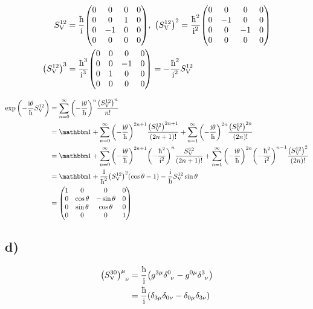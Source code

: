 \documentclass[twoside]{amsart}
\numberwithin{equation}{section}
\begin{document}
\begin{align*}
    S^{12}_\textnormal{V}&=\frac\hbar\im\mqty(0&0&0&0\\0&0&1&0\\0&-1&0&0\\0&0&0&0),\ \qty(S^{12}_\textnormal{V})^2=\frac{\hbar^2}{\im^2}\mqty(0&0&0&0\\0&-1&0&0\\0&0&-1&0\\0&0&0&0)\\
    \qty(S^{12}_\textnormal{V})^3&=\frac{\hbar^3}{\im^3}\mqty(0&0&0&0\\0&0&-1&0\\0&1&0&0\\0&0&0&0)=-\frac{\hbar^2}{\im^2}S^{12}_\textnormal{V}
\end{align*}

\begin{align*}
    \exp\qty(-\frac{\im\theta}{\hbar}S^{12}_\textnormal{V})&=\sum\limits_{n=0}^\infty\qty(-\frac{\im\theta}{\hbar})^n\frac{\qty(S^{12}_\textnormal{V})^n}{n!}\\
    &=\mathbbm 1+\sum\limits_{n=0}^{\infty}\qty(-\frac{\im\theta}{\hbar})^{2n+1}\frac{\qty(S^{12}_\textnormal{V})^{2n+1}}{(2n+1)!}+\sum\limits_{n=1}^{\infty}\qty(-\frac{\im\theta}{\hbar})^{2n}\frac{\qty(S^{12}_\textnormal{V})^{2n}}{(2n)!}\\
    &=\mathbbm 1+\sum\limits_{n=0}^{\infty}\qty(-\frac{\im\theta}{\hbar})^{2n+1}\qty(-\frac{\hbar^2}{\im^2})^{n}\frac{S^{12}_\textnormal{V}}{(2n+1)!}+\sum\limits_{n=1}^{\infty}\qty(-\frac{\im\theta}{\hbar})^{2n}\qty(-\frac{\hbar^2}{\im^2})^{n-1}\frac{\qty(S^{12}_\textnormal{V})^{2}}{(2n)!}\\
    &=\mathbbm 1 +\frac{1}{\hbar^2}\qty(S^{12}_\textnormal{V})^2\qty(\cos\theta-1)-\frac{\im}{\hbar}S^{12}_\textnormal{V}\sin\theta\\
    &=\mqty(1&0&0&0\\0&\cos\theta&-\sin\theta&0\\0&\sin\theta&\cos\theta&0\\0&0&0&1)
\end{align*}

\subsection*{\textbf{d)}}

\begin{align*}
    \tensor{\qty(S^{30}_{\textnormal{V}})}{^\mu_\nu}&=\frac\hbar\im\qty(g^{3\mu}\tensor{\delta}{^0_\nu}-g^{0\mu}\tensor{\delta}{^3_\nu})\\
    &=\frac\hbar\im\qty(\delta_{3\mu}\delta_{0\nu}-\delta_{0\mu}\delta_{3\nu})
\end{align*}
\end{document}
